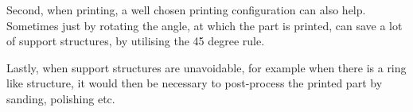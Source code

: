 \begin{enumerate}
\begin{itemize}
      Second, when printing, a well chosen printing configuration can also help. Sometimes just by rotating the angle, at which the part is printed, can save a lot of support structures, by utilising the 45 degree rule.
      
      Lastly, when support structures are unavoidable, for example when there is a ring like structure, it would then be necessary to post-process the printed part by sanding, polishing etc.
  \end{itemize}
\end{enumerate}
